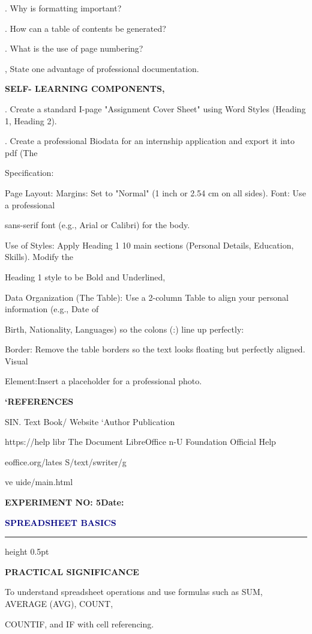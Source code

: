 \documentclass[10pt,a4paper]{article}
\newcommand{\expheading}[2]{%
  \vspace{0.1cm}\noindent\textbf{\large EXPERIMENT NO: #1}\hfill\textbf{Date: #2}\par
}
\newcommand{\exptitle}[1]{%
  \begin{center}\vspace{-2mm}\textcolor{navy}{\fontsize{20}{22}\selectfont\bfseries #1}\end{center}
  \vspace{1mm}\hrule height 0.5pt\vspace{3mm}
}
\begin{document}
. Why is formatting important?\par
{}. How can a table of contents be generated?\par
{}. What is the use of page numbering?\par
{}, State one advantage of professional documentation.\par
\medskip\noindent\textbf{SELF- LEARNING COMPONENTS,}\par
{}. Create a standard I-page "Assignment Cover Sheet" using Word Styles (Heading 1, Heading 2).\par
{}. Create a professional Biodata for an internship application and export it into pdf (The\par
\noindent Specification:\par
\noindent Page Layout: Margins: Set to "Normal" (1 inch or 2.54 cm on all sides). Font: Use a professional\par
\noindent sans-serif font (e.g., Arial or Calibri) for the body.\par
\noindent Use of Styles: Apply Heading 1 10 main sections (Personal Details, Education, Skills). Modify the\par
\noindent Heading 1 style to be Bold and Underlined,\par
\noindent Data Organization (The Table): Use a 2-column Table to align your personal information (e.g., Date of\par
\noindent Birth, Nationality, Languages) so the colons (:) line up perfectly:\par
\noindent Border: Remove the table borders so the text looks floating but perfectly aligned. Visual\par
\noindent Element:Insert a placeholder for a professional photo.\par
\medskip\noindent\textbf{‘REFERENCES}\par
\noindent SIN. Text Book/ Website ‘Author Publication\par

                 https://help libr   The Document   LibreOffice n-U    Foundation   Official Help\par
\noindent eoffice.org/lates                  S/text/swriter/g\par
\noindent ve                                 uide/main.html\par
\clearpage
\null
\thispagestyle{main}
\clearpage
\clearpage
\expheading{5}{\underline{\hspace{1.8cm}}}
\exptitle{SPREADSHEET BASICS}
\medskip\noindent\textbf{PRACTICAL SIGNIFICANCE}\par
\noindent To understand spreadsheet operations and use formulas such as SUM, AVERAGE (AVG), COUNT,\par
\noindent COUNTIF, and IF with cell referencing.\par
\end{document}
